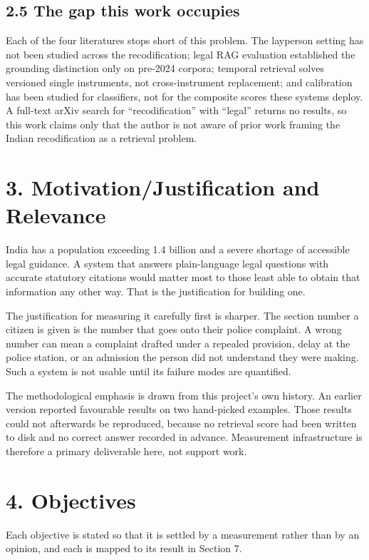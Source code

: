 \documentclass[12pt,a4paper]{article}
\begin{document}
\subsection*{2.5 The gap this work occupies}
Each of the four literatures stops short of this problem. The layperson setting has not been studied across the recodification; legal RAG evaluation established the grounding distinction only on pre-2024 corpora; temporal retrieval solves versioned single instruments, not cross-instrument replacement; and calibration has been studied for classifiers, not for the composite scores these systems deploy. A full-text arXiv search for ``recodification'' with ``legal'' returns no results, so this work claims only that the author is not aware of prior work framing the Indian recodification as a retrieval problem.

\section*{3. Motivation/Justification and Relevance}
India has a population exceeding 1.4 billion and a severe shortage of accessible legal guidance. A system that answers plain-language legal questions with accurate statutory citations would matter most to those least able to obtain that information any other way. That is the justification for building one.

The justification for measuring it carefully first is sharper. The section number a citizen is given is the number that goes onto their police complaint. A wrong number can mean a complaint drafted under a repealed provision, delay at the police station, or an admission the person did not understand they were making. Such a system is not usable until its failure modes are quantified.

The methodological emphasis is drawn from this project's own history. An earlier version reported favourable results on two hand-picked examples. Those results could not afterwards be reproduced, because no retrieval score had been written to disk and no correct answer recorded in advance. Measurement infrastructure is therefore a primary deliverable here, not support work.

\section*{4. Objectives}
Each objective is stated so that it is settled by a measurement rather than by an opinion, and each is mapped to its result in Section 7.
\end{document}
